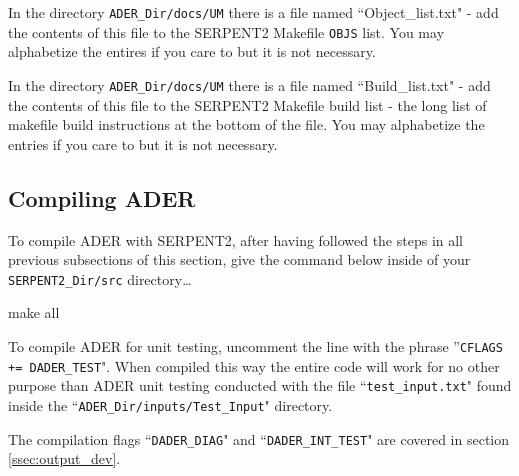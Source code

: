 In the directory \texttt{ADER\_Dir/docs/UM} there is a file named 
``Object\_list.txt" - add the contents of this file to the SERPENT2 Makefile
\texttt{OBJS} list. You may alphabetize the entires if you care to but it is
not necessary.

In the directory \texttt{ADER\_Dir/docs/UM} there is a file named 
``Build\_list.txt" - add the contents of this file to the SERPENT2 Makefile
build list - the long list of makefile build instructions at the bottom
of the file. You may alphabetize the entries if you care to but it is
not necessary.

\subsection{Compiling ADER}\label{ssec:compile}
To compile ADER with SERPENT2, after having followed the steps in all previous
subsections of this section, give the command below inside of your 
\texttt{SERPENT2\_Dir/src} directory\ldots

\begin{li}
make all
\end{li}

To compile ADER for unit testing, uncomment the line with the phrase
''\texttt{CFLAGS += DADER\_TEST}". When compiled this way the entire code will
work for no other purpose than ADER unit testing conducted with the file
``\texttt{test\_input.txt}" found inside the 
``\texttt{ADER\_Dir/inputs/Test\_Input}" directory.

The compilation flags ``\texttt{DADER\_DIAG}" and ``\texttt{DADER\_INT\_TEST}"
are covered in section \ref{ssec:output_dev}.
